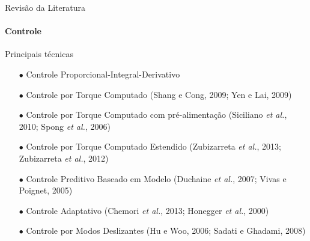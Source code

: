 \documentclass[25pt,landscape]{beamer}
\begin{document}
\begin{frame}{Revisão da Literatura}
    \framesubtitle{Controle}
    \pause
    \begin{block}{Principais técnicas}
        \begin{itemize}
            \item[$\bullet$] Controle Proporcional-Integral-Derivativo \\
            \item[$\bullet$] Controle por Torque Computado (Shang e Cong, 2009; Yen e Lai, 2009) \\ %
            \item[$\bullet$] Controle por Torque Computado com pré-alimentação (Siciliano \emph{et al.}, 2010; Spong \emph{et al.}, 2006)\\  %
            \item[$\bullet$] Controle por Torque Computado Estendido (Zubizarreta \emph{et al.}, 2013; Zubizarreta \emph{et al.}, 2012) \\ %
            \item[$\bullet$] Controle Preditivo Baseado em Modelo (Duchaine \emph{et al.}, 2007; Vivas e Poignet, 2005) \\ %
            \item[$\bullet$] Controle Adaptativo (Chemori \emph{et al.}, 2013; Honegger \emph{et al.}, 2000)  \\ %
            \item[$\bullet$] Controle por Modos Deslizantes (Hu e Woo, 2006; Sadati e Ghadami, 2008)  \\ %
        \end{itemize}
    \end{block}
\end{frame}
\end{document}

